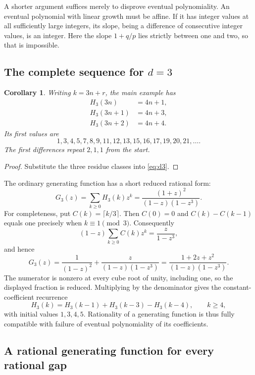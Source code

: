 \documentclass[11pt,a4paper]{article}
\numberwithin{equation}{section}
\newtheorem{corollary}[theorem]{Corollary}
\theoremstyle{definition}
\theoremstyle{remark}
\begin{document}
A shorter argument suffices merely to disprove eventual polynomiality.
An eventual polynomial with linear growth must be affine. If it has integer
values at all sufficiently large integers, its slope, being a difference
of consecutive integer values, is an integer. Here the slope $1+q/p$ lies
strictly between one and two, so that is impossible.

\subsection{The complete sequence for \texorpdfstring{$d=3$}{d = 3}}

\begin{corollary}
\label{cor:d3sequence}
Writing $k=3n+r$, the main example has
\begin{align*}
H_3(3n)&=4n+1,\\
H_3(3n+1)&=4n+3,\\
H_3(3n+2)&=4n+4.
\end{align*}
Its first values are
\[
1,3,4,5,7,8,9,11,12,13,15,16,17,19,20,21,\ldots.
\]
The first differences repeat $2,1,1$ from the start.
\end{corollary}

\begin{proof}
Substitute the three residue classes into \eqref{eq:d3}.
\end{proof}

The ordinary generating function has a short reduced rational form:
\begin{equation}
\label{eq:GF}
G_3(z)=\sum_{k\geq0}H_3(k)z^k
=\frac{(1+z)^2}{(1-z)(1-z^3)}.
\end{equation}
For completeness, put $C(k)=\lceil k/3\rceil$. Then $C(0)=0$ and
$C(k)-C(k-1)$ equals one precisely when $k\equiv1\pmod3$. Consequently
\[
(1-z)\sum_{k\geq0}C(k)z^k=\frac{z}{1-z^3},
\]
and hence
\[
G_3(z)=\frac{1}{(1-z)^2}+\frac{z}{(1-z)(1-z^3)}
=\frac{1+2z+z^2}{(1-z)(1-z^3)}.
\]
The numerator is nonzero at every cube root of unity, including one, so the
displayed fraction is reduced. Multiplying by the denominator gives the
constant-coefficient recurrence
\begin{equation}
\label{eq:recurrence}
H_3(k)=H_3(k-1)+H_3(k-3)-H_3(k-4),\qquad k\geq4,
\end{equation}
with initial values $1,3,4,5$. Rationality of a generating function is thus
fully compatible with failure of eventual polynomiality of its coefficients.

\subsection{A rational generating function for every rational gap}
\end{document}

